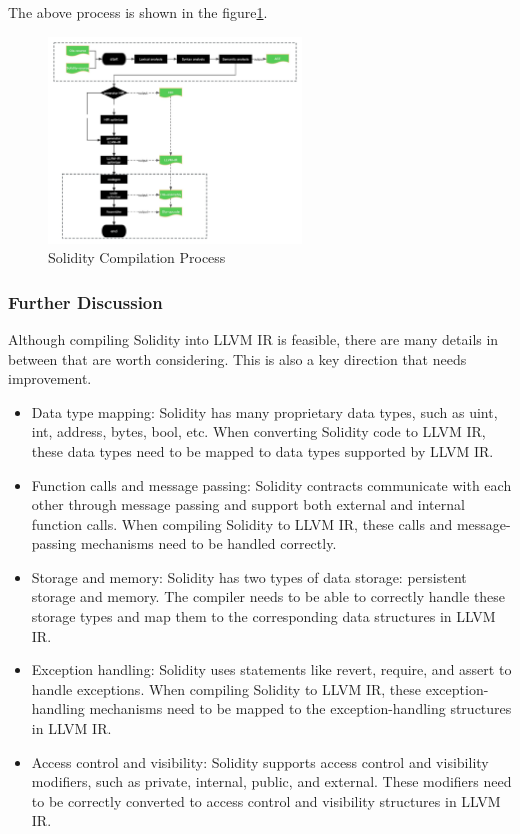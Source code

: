 The above process is shown in the figure\ref{fig:solidity-compile}.

\begin{figure}[!ht]
    \centering
    \includegraphics[width=0.6\textwidth]{images/solidity-compile.jpg}
    \caption{Solidity Compilation Process}
    \label{fig:solidity-compile}
\end{figure}

\subsubsection{Further Discussion}

Although compiling Solidity into LLVM IR is feasible, there are many details in between that are worth considering. This is also a key direction that needs improvement.

\begin{itemize}
    \item Data type mapping: Solidity has many proprietary data types, such as uint, int, address, bytes, bool, etc. When converting Solidity code to LLVM IR, these data types need to be mapped to data types supported by LLVM IR.

    \item Function calls and message passing: Solidity contracts communicate with each other through message passing and support both external and internal function calls. When compiling Solidity to LLVM IR, these calls and message-passing mechanisms need to be handled correctly.

    \item Storage and memory: Solidity has two types of data storage: persistent storage and memory. The compiler needs to be able to correctly handle these storage types and map them to the corresponding data structures in LLVM IR.

    \item Exception handling: Solidity uses statements like revert, require, and assert to handle exceptions. When compiling Solidity to LLVM IR, these exception-handling mechanisms need to be mapped to the exception-handling structures in LLVM IR.

    \item Access control and visibility: Solidity supports access control and visibility modifiers, such as private, internal, public, and external. These modifiers need to be correctly converted to access control and visibility structures in LLVM IR.
\end{itemize}

